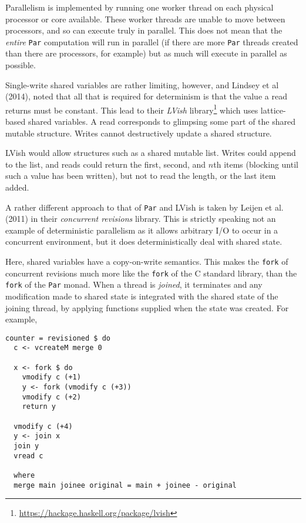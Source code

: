 Parallelism is implemented by running one worker thread on each
physical processor or core available. These worker threads are unable
to move between processors, and so can execute truly in parallel. This
does not mean that the \textit{entire} \verb|Par| computation will run
in parallel (if there are more \verb|Par| threads created than there
are processors, for example) but as much will execute in parallel as
possible.

Single-write shared variables are rather limiting, however, and
Lindsey et al (2014)\nocite{lvish}, noted that all that is required
for determinism is that the value a read returns must be
constant. This lead to their \textit{LVish}
library\footnote{\url{https://hackage.haskell.org/package/lvish}}
which uses lattice-based shared variables. A read corresponds to
glimpsing some part of the shared mutable structure. Writes cannot
destructively update a shared structure.

LVish would allow structures such as a shared mutable list. Writes
could append to the list, and reads could return the first, second,
and $n$th items (blocking until such a value has been written), but
not to read the length, or the last item added.

A rather different approach to that of \verb|Par| and LVish is taken
by Leijen et al. (2011)\nocite{revisions} in their \textit{concurrent
  revisions} library. This is strictly speaking not an example of
deterministic parallelism as it allows arbitrary I/O to occur in a
concurrent environment, but it does deterministically deal with shared
state.

Here, shared variables have a copy-on-write semantics. This makes the
\verb|fork| of concurrent revisions much more like the \verb|fork| of
the C standard library, than the \verb|fork| of the \verb|Par|
monad. When a thread is \textit{joined}, it terminates and any
modification made to shared state is integrated with the shared state
of the joining thread, by applying functions supplied when the state
was created. For example,

\begin{verbatim}
counter = revisioned $ do
  c <- vcreateM merge 0

  x <- fork $ do
    vmodify c (+1)
    y <- fork (vmodify c (+3))
    vmodify c (+2)
    return y

  vmodify c (+4)
  y <- join x
  join y
  vread c

  where
  merge main joinee original = main + joinee - original
\end{verbatim}

